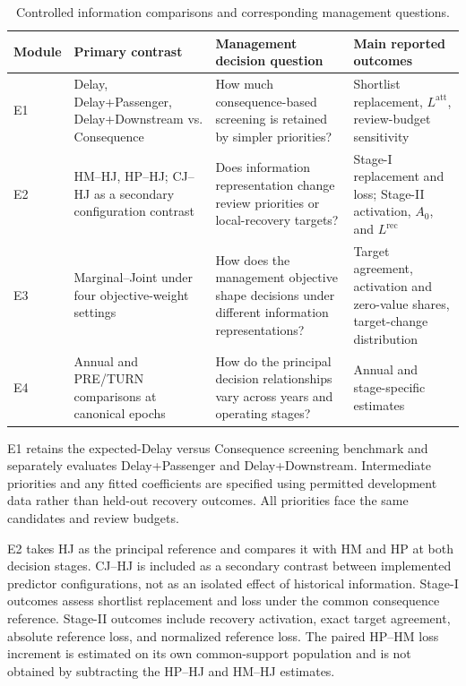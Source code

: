 \begin{table}[t]
\centering
\scriptsize
\caption{Controlled information comparisons and corresponding management questions.}
\label{tab:information_contrasts}
\renewcommand{\arraystretch}{1.13}
\setlength{\tabcolsep}{3.0pt}
\begin{tabular}{p{0.85cm}p{3.95cm}p{5.0cm}p{4.95cm}}
\hline
Module & Primary contrast & Management decision question & Main reported outcomes \\
\hline
E1 & Delay, Delay+Passenger, Delay+Downstream vs. Consequence & How much consequence-based screening is retained by simpler priorities? & Shortlist replacement, $L^{\mathrm{att}}$, review-budget sensitivity \\
E2 & HM--HJ, HP--HJ; CJ--HJ as a secondary configuration contrast & Does information representation change review priorities or local-recovery targets? & Stage-I replacement and loss; Stage-II activation, $A_0$, and $L^{\mathrm{rec}}$ \\
E3 & Marginal--Joint under four objective-weight settings & How does the management objective shape decisions under different information representations? & Target agreement, activation and zero-value shares, target-change distribution \\
E4 & Annual and PRE/TURN comparisons at canonical epochs & How do the principal decision relationships vary across years and operating stages? & Annual and stage-specific estimates \\
\hline
\end{tabular}
\end{table}

E1 retains the expected-Delay versus Consequence screening benchmark and separately evaluates Delay+Passenger and Delay+Downstream. Intermediate priorities and any fitted coefficients are specified using permitted development data rather than held-out recovery outcomes. All priorities face the same candidates and review budgets.

E2 takes HJ as the principal reference and compares it with HM and HP at both decision stages. CJ--HJ is included as a secondary contrast between implemented predictor configurations, not as an isolated effect of historical information. Stage-I outcomes assess shortlist replacement and loss under the common consequence reference. Stage-II outcomes include recovery activation, exact target agreement, absolute reference loss, and normalized reference loss. The paired HP--HM loss increment is estimated on its own common-support population and is not obtained by subtracting the HP--HJ and HM--HJ estimates.

